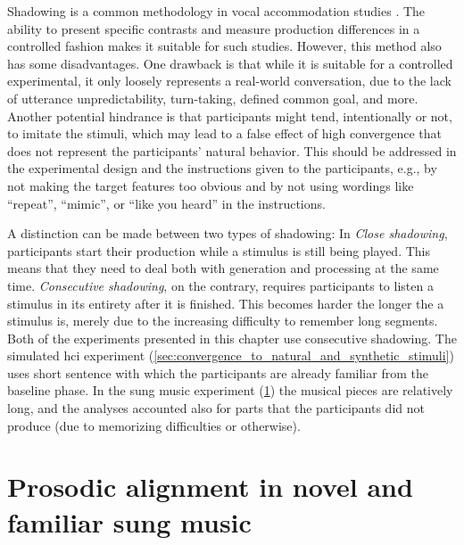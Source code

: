 Shadowing is a common methodology in vocal accommodation studies \citep[e.g.,][]{Pardo2018comparison, Babel2014novelty, Shockley2004imitation, Walker2015repeat, Dias2016visibilivty}.
The ability to present specific contrasts and measure production differences in a controlled fashion makes it suitable for such studies.
However, this method also has some disadvantages.
One drawback is that while it is suitable for a controlled experimental, it only loosely represents a real-world conversation, due to the lack of utterance unpredictability, turn-taking, defined common goal, and more.
Another potential hindrance is that participants might tend, intentionally or not, to imitate the stimuli, which may lead to a false effect of high convergence that does not represent the participants' natural behavior.
This should be addressed in the experimental design and the instructions given to the participants, e.g., by not making the target features too obvious and by not using wordings like \enquote{repeat}, \enquote{mimic}, or \enquote{like you heard} in the instructions.

A distinction can be made between two types of shadowing:
In \emph{Close shadowing}, participants start their production while a stimulus is still being played.
This means that they need to deal both with generation and processing at the same time.
\emph{Consecutive shadowing}, on the contrary, requires participants to listen a stimulus in its entirety after it is finished.
This becomes harder the longer the a stimulus is, merely due to the increasing difficulty to remember long segments.
Both of the experiments presented in this chapter use consecutive shadowing.
The simulated \ac{hci} experiment (\cref{sec:convergence_to_natural_and_synthetic_stimuli}) uses short sentence with which the participants are already familiar from the baseline phase. 
In the sung music experiment (\cref{sec:alignment_in_novel_and_familiar_sung_music}) the musical pieces are relatively long, and the analyses accounted also for parts that the participants did not produce (due to memorizing difficulties or otherwise).

\section{Prosodic alignment in novel and familiar sung music}
\label{sec:alignment_in_novel_and_familiar_sung_music}


